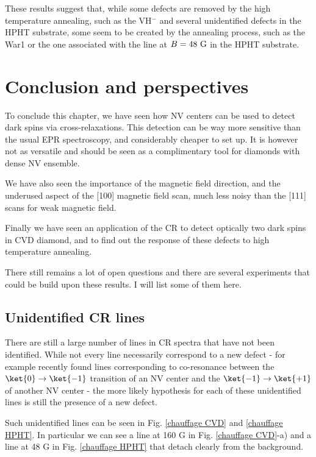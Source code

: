 \documentclass[a4paper,11pt]{report}
\begin{document}
These results suggest that, while some defects are removed by the high temperature annealing, such as the VH$^-$ and several unidentified defects in the HPHT substrate, some seem to be created by the annealing process, such as the War1 or the one associated with the line at $B = 48\ \rm G$ in the HPHT substrate.

\section{Conclusion and perspectives}

To conclude this chapter, we have seen how NV centers can be used to detect dark spins via cross-relaxations. This detection can be way more sensitive than the usual EPR spectroscopy, and considerably cheaper to set up. It is however not as versatile and should be seen as a complimentary tool for diamonds with dense NV ensemble. 

We have also seen the importance of the magnetic field direction, and the underused aspect of the [100] magnetic field scan, much less noisy than the [111] scans for weak magnetic field.

Finally we have seen an application of the CR to detect optically two dark spins in CVD diamond, and to find out the response of these defects to high temperature annealing.

There still remains a lot of open questions and there are several experiments that could be build upon these results. I will list some of them here.

\subsection{Unidentified CR lines}

There are still a large number of lines in CR spectra that have not been identified. While not every line necessarily correspond to a new defect - for example \citep{wunderlich2021magnetic} recently found lines corresponding to co-resonance between the $\ket{0} \to \ket{-1}$ transition of an NV center and the $\ket{-1} \to \ket{+1}$ of another NV center - the more likely hypothesis for each of these unidentified lines is still the presence of a new defect.

Such unidentified lines can be seen in Fig. \ref{chauffage CVD} and \ref{chauffage HPHT}. In particular we can see a line at 160 G in Fig. \ref{chauffage CVD}-a) and a line at 48 G in Fig. \ref{chauffage HPHT} that detach clearly from the background. 
\end{document}
